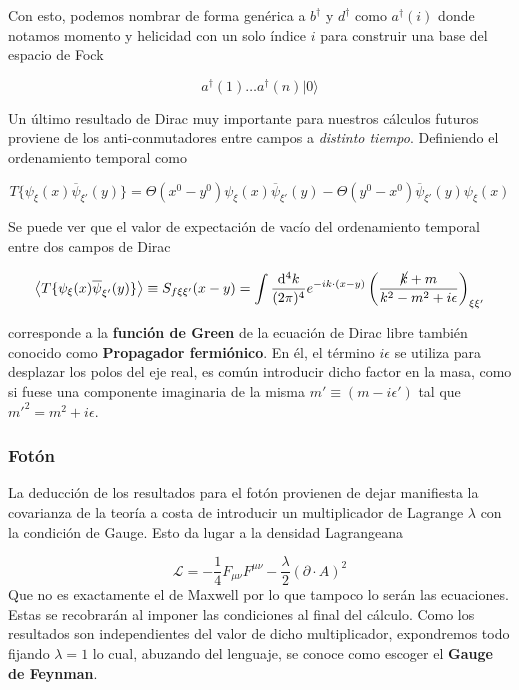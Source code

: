 \documentclass[tickz]{article}
\numberwithin{equation}{section}
\begin{document}
Con esto, podemos nombrar de forma genérica a $ b^{\dagger} $ y $ d^{\dagger} $ como $ a^{\dagger}(i) $ donde notamos momento y helicidad con un solo índice $ i $ para construir una base del espacio de Fock

\begin{equation}\label{key}
a^{\dagger}(1)\dots a^{\dagger}(n)|0\rangle
\end{equation}  

Un último resultado de Dirac muy importante para nuestros cálculos futuros proviene de los anti-conmutadores entre campos a \textit{distinto tiempo}. Definiendo el ordenamiento temporal como

\begin{equation}\label{key}
T\{\psi_{\xi}(x)\overline{\psi}_{\xi'}(y)\}=\Theta(x^0 - y^0)\psi_{\xi}(x)\overline{\psi}_{\xi'}(y) - \Theta(y^0 - x^0)\overline{\psi}_{\xi'}(y)\psi_{\xi}(x)
\end{equation}

Se puede ver que el valor de expectación de vacío del ordenamiento temporal entre dos campos de Dirac  

\begin{equation}\label{prop_dirac}
\left\langle T\{\psi_{\xi}(x)\overline{\psi}_{\xi'}(y)\} \right\rangle \equiv S_{f \xi \xi'}(x-y)=\int\frac{\mathrm{d^4}k}{(2\pi)^{4}}e^{-ik\cdot(x-y)}\left(\frac{\cancel{k}+m}{k^2-m^2+i\epsilon}\right)_{\xi\xi'}
\end{equation}

corresponde a la \textbf{función de Green} de la ecuación de Dirac libre también conocido como \textbf{Propagador fermiónico}. En él, el término $ i\epsilon $ se utiliza para desplazar los polos del eje real, es común introducir dicho factor en la masa, como si fuese una componente imaginaria de la misma $ m'\equiv(m-i\epsilon')$ tal que $ m'^2=m^2 + i\epsilon $.

\subsubsection{Fotón}\label{sec_foton}

La deducción de los resultados para el fotón provienen de dejar manifiesta la covarianza de la teoría a costa de introducir un multiplicador de Lagrange $ \lambda $ con la condición de Gauge. Esto da lugar a la densidad Lagrangeana

\begin{equation}\label{key}
\mathscr{L}=-\frac{1}{4}F_{\mu\nu}F^{\mu\nu}-\frac{\lambda}{2}\left(\partial \cdot A\right)^2
\end{equation}
Que no es exactamente el de Maxwell por lo que tampoco lo serán las ecuaciones. Estas se recobrarán al imponer las condiciones al final del cálculo. Como los resultados son independientes del valor de dicho multiplicador, expondremos todo fijando $ \lambda=1 $ lo cual, abuzando del lenguaje, se conoce como escoger el \textbf{Gauge de Feynman}.
\end{document}
